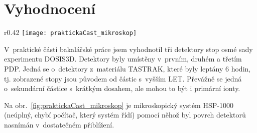 \section{Vyhodnocení}
\begin{wrapfigure}{r}{0.42\textwidth}
  \centering
  \texttt{[image: praktickaCast\_mikroskop]}
  \caption{Vysoko rychlostní optický mikroskop HSP-1000.~\cite{dosis_HSP1000}}
  \label{fig:praktickaCast_mikroskop}
  \vspace{-10pt}
\end{wrapfigure}
V~praktické části bakalářské práce jsem vyhodnotil tři detektory stop osmé sady experimentu DOSIS3D. Detektory byly umístěny v~prvním, druhém a třetím PDP. Jedná se o~detektory z~materiálu TASTRAK, které byly leptány 6 hodin, tj. zobrazené stopy jsou původem od částic s~vyšším LET. Převážně se jedná o~sekundární částice s~krátkým dosahem, ale mohou to být i primární ionty.

Na obr.~\ref{fig:praktickaCast_mikroskop} je mikroskopický systém HSP-1000 (neúplný, chybí počítač, který systém řídí) pomocí něhož byl povrch detektorů nasnímán v~dostatečném přiblížení.

